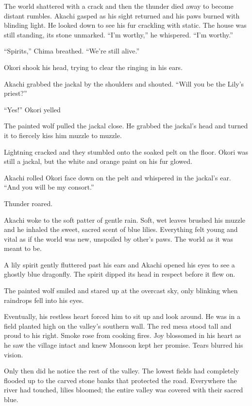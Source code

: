 The world shattered with a crack and then the thunder died away to become distant rumbles. Akachi gasped as his sight returned and his paws burned with blinding light. He looked down to see his fur crackling with static. The house was still standing, its stone unmarked. ``I'm worthy,'' he whispered. ``I'm worthy.''

``Spirits,'' Chima breathed. ``We're still alive.''

Okori shook his head, trying to clear the ringing in his ears.

Akachi grabbed the jackal by the shoulders and shouted. ``Will you be the Lily's priest?''

``Yes!'' Okori yelled

The painted wolf pulled the jackal close. He grabbed the jackal's head and turned it to fiercely kiss him muzzle to muzzle.

Lightning cracked and they stumbled onto the soaked pelt on the floor. Okori was still a jackal, but the white and orange paint on his fur glowed.

Akachi rolled Okori face down on the pelt and whispered in the jackal's ear. ``And you will be my consort.''

Thunder roared.

\secdiv

\noindent Akachi woke to the soft patter of gentle rain. Soft, wet leaves brushed his muzzle and he inhaled the sweet, sacred scent of blue lilies. Everything felt young and vital as if the world was new, unspoiled by other's paws. The world as it was meant to be.

A lily spirit gently fluttered past his ears and Akachi opened his eyes to see a ghostly blue dragonfly. The spirit dipped its head in respect before it flew on.

The painted wolf smiled and stared up at the overcast sky, only blinking when raindrops fell into his eyes.

Eventually, his restless heart forced him to sit up and look around. He was in a field planted high on the valley's southern wall. The red mesa stood tall and proud to his right. Smoke rose from cooking fires. Joy blossomed in his heart as he saw the village intact and knew Monsoon kept her promise. Tears blurred his vision.

Only then did he notice the rest of the valley. The lowest fields had completely flooded up to the carved stone banks that protected the road. Everywhere the river had touched, lilies bloomed; the entire valley was covered with their sacred blue.

